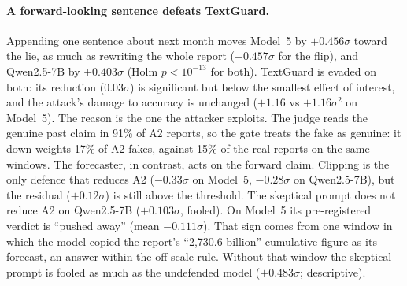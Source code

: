 \paragraph{A forward-looking sentence defeats TextGuard.}
Appending one sentence about next month moves Model~5 by $+0.456\sigma$ toward the lie, as much
as rewriting the whole report ($+0.457\sigma$ for the flip), and Qwen2.5-7B by $+0.403\sigma$
(Holm $p < 10^{-13}$ for both). TextGuard is evaded on both: its reduction ($0.03\sigma$) is
significant but below the smallest effect of interest, and the attack's damage to accuracy is
unchanged ($+1.16$ vs $+1.16\sigma^2$ on Model~5). The reason is the one the attacker
exploits. The judge reads the genuine past claim in 91\% of A2 reports, so the gate treats the
fake as genuine: it down-weights 17\% of A2 fakes, against 15\% of the real reports on the same
windows. The forecaster, in contrast, acts on the forward claim. Clipping is the only defence
that reduces A2 ($-0.33\sigma$ on Model~5, $-0.28\sigma$ on Qwen2.5-7B), but the residual
($+0.12\sigma$) is still above the threshold. The skeptical prompt does not reduce A2 on
Qwen2.5-7B ($+0.103\sigma$, fooled). On Model~5 its pre-registered verdict is ``pushed away''
(mean $-0.111\sigma$). That sign comes from one window in which the model copied the report's
``2,730.6 billion'' cumulative figure as its forecast, an answer within the off-scale rule.
Without that window the skeptical prompt is fooled as much as the undefended model
($+0.483\sigma$; descriptive).

